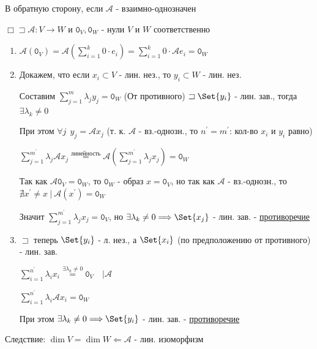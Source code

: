 \documentclass[12pt]{article}
\begin{document}
    В обратную сторону, если $\mathcal{A}$ - взаимно-однозначен

    $\Box \sqsupset \mathcal{A} : V \rightarrow W$ и $\texttt{0}_V, \texttt{0}_W$ - нули $V$ и $W$ соответственно
    \begin{enumerate}
        \item $\mathcal{A}(\texttt{0}_V) = \mathcal{A}(\sum^k_{i=1} 0 \cdot e_i) = \sum^k_{i=1} 0 \cdot \mathcal{A}e_i = \texttt{0}_W$

        \item Докажем, что если ${x_i} \subset V$ - лин. нез., то ${y_i} \subset W$ - лин. нез.

        Составим $\sum^m_{j=1} \lambda_j y_j = \texttt{0}_W$ (От противного) $\sqsupset \Set{y_i}$ - лин. зав., тогда $\exists \lambda_k \neq 0$

        При этом $\forall j \ \ y_j = \mathcal{A}x_j$ (т. к. $\mathcal{A}$ - вз.-однозн., то $n^\prime = m^\prime$: кол-во $x_i$ и $y_i$ равно)

        $\sum^{m^\prime}_{j=1} \lambda_j \mathcal{A}x_j \stackrel{\text{линейность}}{=} \mathcal{A} (\sum^{m^\prime}_{j=1} \lambda_j x_j) = \texttt{0}_W$

        Так как $\mathcal{A}\texttt{0}_V = \texttt{0}_W$, то $\texttt{0}_W$ - образ $x = \texttt{0}_V$, но так как $\mathcal{A}$ - вз.-однозн., то
        $\nexists x^\prime \neq x \ | \ \mathcal{A}(x^\prime) = \texttt{0}_W$

        Значит $\sum^{m^\prime}_{j=1} \lambda_j x_j = \texttt{0}_V$, но $\exists \lambda_k \neq 0 \Longrightarrow \Set{x_j}$ - лин. зав. - \underline{противоречие}

        \item $\sqsupset$ теперь $\Set{y_i}$ - л. нез., а $\Set{x_i}$ (по предположению от противного) - лин. зав.

        $\sum^{n^\prime}_{i = 1} \lambda_i x_i \stackrel{\exists \lambda_k \neq 0}{=} \texttt{0}_V \quad \Big| \mathcal{A}$

        $\sum^{n^\prime}_{i = 1} \lambda_i \mathcal{A}x_i = \texttt{0}_W$

        При этом $\exists \lambda_k \neq 0 \Longrightarrow \Set{y_i}$ - лин. зав. - \underline{противоречие}

    \end{enumerate}

    Следствие: $\dim V = \dim W \Longleftarrow \mathcal{A}$ - лин. изоморфизм

    \hypertarget{reverselinearoperator}{}
\end{document}
